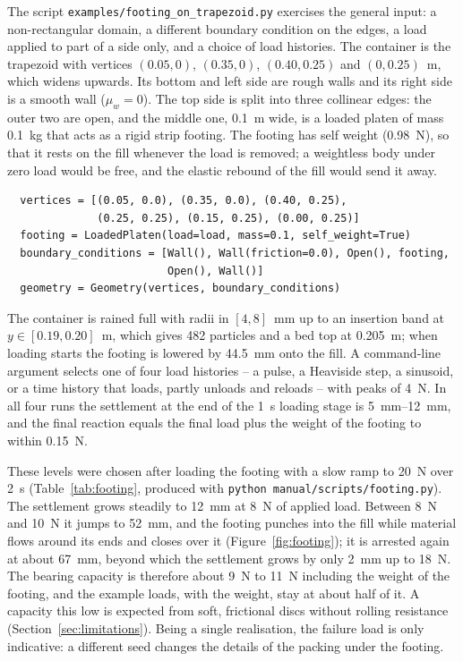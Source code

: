 The script \texttt{examples/footing\_on\_trapezoid.py} exercises the general
input: a non-rectangular domain, a different boundary condition on the edges, a
load applied to part of a side only, and a choice of load histories.  The
container is the trapezoid with vertices $(0.05,0)$, $(0.35,0)$, $(0.40,0.25)$
and $(0,0.25)$~\unit{\metre}, which widens upwards.  Its bottom and left side
are rough walls and its right side is a smooth wall ($\mu_{w}=0$).  The top side
is split into three collinear edges: the outer two are open, and the middle one,
\qty{0.1}{\metre} wide, is a loaded platen of mass \qty{0.1}{\kilogram} that acts
as a rigid strip footing.  The footing has self weight (\qty{0.98}{\newton}), so
that it rests on the fill whenever the load is removed; a weightless body under
zero load would be free, and the elastic rebound of the fill would send it away.
\begin{verbatim}
  vertices = [(0.05, 0.0), (0.35, 0.0), (0.40, 0.25),
              (0.25, 0.25), (0.15, 0.25), (0.00, 0.25)]
  footing = LoadedPlaten(load=load, mass=0.1, self_weight=True)
  boundary_conditions = [Wall(), Wall(friction=0.0), Open(), footing,
                         Open(), Wall()]
  geometry = Geometry(vertices, boundary_conditions)
\end{verbatim}
The container is rained full with radii in $[4,8]$~\unit{\milli\metre} up to an
insertion band at $y\in[0.19,0.20]$~\unit{\metre}, which gives \num{482}
particles and a bed top at \qty{0.205}{\metre}; when loading starts the footing
is lowered by \qty{44.5}{\milli\metre} onto the fill.  A command-line argument
selects one of four load histories -- a pulse, a Heaviside step, a sinusoid, or
a time history that loads, partly unloads and reloads -- with peaks of
\qty{4}{\newton}.  In all four runs the settlement at the end of the
\qty{1}{\second} loading stage is \qtyrange{5}{12}{\milli\metre}, and the final
reaction equals the final load plus the weight of the footing to within
\qty{0.15}{\newton}.

These levels were chosen after loading the footing with a slow ramp to
\qty{20}{\newton} over \qty{2}{\second} (Table~\ref{tab:footing}, produced with
\texttt{python manual/scripts/footing.py}).  The settlement grows steadily to
\qty{12}{\milli\metre} at \qty{8}{\newton} of applied load.  Between
\qty{8}{\newton} and \qty{10}{\newton} it jumps to \qty{52}{\milli\metre}, and
the footing punches into the fill while material flows around its ends and closes
over it (Figure~\ref{fig:footing}); it is arrested again at about
\qty{67}{\milli\metre}, beyond which the settlement grows by only
\qty{2}{\milli\metre} up to \qty{18}{\newton}.  The bearing capacity is
therefore about \qty{9}{\newton} to \qty{11}{\newton} including the weight of the
footing, and the example loads, with the weight, stay at about half of it.  A
capacity this low is expected from soft, frictional discs without rolling
resistance (Section~\ref{sec:limitations}).  Being a single realisation, the
failure load is only indicative: a different seed changes the details of the
packing under the footing.

